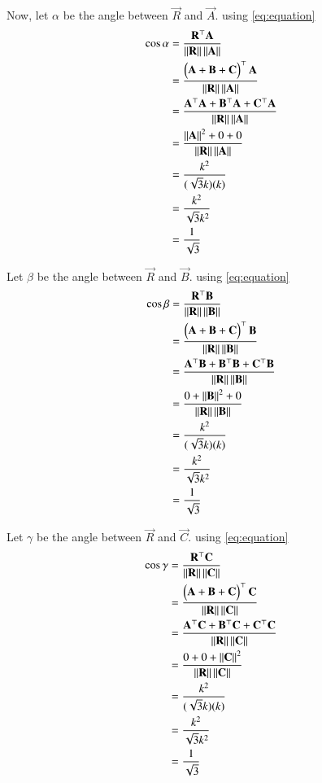 \documentclass[journal]{IEEEtran}
\begin{document}
Now, let $\alpha$ be the angle between $\vec{R}$ and $\vec{A}$. using \eqref{eq:equation}
\begin{align}
\cos \alpha &= \frac{\mathbf{R}^\top \mathbf{A}}{\left\lVert\mathbf{R}\right\rVert \left\lVert\mathbf{A}\right\rVert} \\
&= \frac{\begin{pmatrix}\mathbf{A} + \mathbf{B} + \mathbf{C}\end{pmatrix}^\top \mathbf{A}}{\left\lVert\mathbf{R}\right\rVert \left\lVert\mathbf{A}\right\rVert} \\
&= \frac{\mathbf{A}^\top \mathbf{A} + \mathbf{B}^\top \mathbf{A} + \mathbf{C}^\top \mathbf{A}}{\left\lVert\mathbf{R}\right\rVert \left\lVert\mathbf{A}\right\rVert} \\
&= \frac{\left\lVert\mathbf{A}\right\rVert^2 + 0 + 0}{\left\lVert\mathbf{R}\right\rVert \left\lVert\mathbf{A}\right\rVert} \\
&= \frac{k^2}{(\sqrt{3}k)(k)} \\
&= \frac{k^2}{\sqrt{3}k^2} \\
&= \frac{1}{\sqrt{3}}
\end{align}

Let $\beta$ be the angle between $\vec{R}$ and $\vec{B}$.  using \eqref{eq:equation}
\begin{align}
\cos \beta &= \frac{\mathbf{R}^\top \mathbf{B}}{\left\lVert\mathbf{R}\right\rVert \left\lVert\mathbf{B}\right\rVert}  \\
&= \frac{\begin{pmatrix}\mathbf{A} + \mathbf{B} + \mathbf{C}\end{pmatrix}^\top \mathbf{B}}{\left\lVert\mathbf{R}\right\rVert \left\lVert\mathbf{B}\right\rVert} \\
&= \frac{\mathbf{A}^\top \mathbf{B} + \mathbf{B}^\top \mathbf{B} + \mathbf{C}^\top \mathbf{B}}{\left\lVert\mathbf{R}\right\rVert \left\lVert\mathbf{B}\right\rVert} \\
&= \frac{0 + \left\lVert\mathbf{B}\right\rVert^2 + 0}{\left\lVert\mathbf{R}\right\rVert \left\lVert\mathbf{B}\right\rVert} \\
&= \frac{k^2}{(\sqrt{3}k)(k)} \\
&= \frac{k^2}{\sqrt{3}k^2} \\
&= \frac{1}{\sqrt{3}}
\end{align}

Let $\gamma$ be the angle between $\vec{R}$ and $\vec{C}$. using \eqref{eq:equation}
\begin{align}
\cos \gamma &= \frac{\mathbf{R}^\top \mathbf{C}}{\left\lVert\mathbf{R}\right\rVert \left\lVert\mathbf{C}\right\rVert} \\
&= \frac{\begin{pmatrix}\mathbf{A} + \mathbf{B} + \mathbf{C}\end{pmatrix}^\top \mathbf{C}}{\left\lVert\mathbf{R}\right\rVert \left\lVert\mathbf{C}\right\rVert} \\
&= \frac{\mathbf{A}^\top \mathbf{C} + \mathbf{B}^\top \mathbf{C} + \mathbf{C}^\top \mathbf{C}}{\left\lVert\mathbf{R}\right\rVert \left\lVert\mathbf{C}\right\rVert} \\
&= \frac{0 + 0 + \left\lVert\mathbf{C}\right\rVert^2}{\left\lVert\mathbf{R}\right\rVert \left\lVert\mathbf{C}\right\rVert} \\
&= \frac{k^2}{(\sqrt{3}k)(k)} \\
&= \frac{k^2}{\sqrt{3}k^2} \\
&= \frac{1}{\sqrt{3}}
\end{align}
\end{document}
